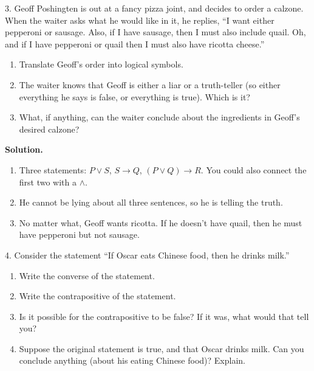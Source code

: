 \documentclass[10pt,]{book}
\theoremstyle{plain}
\theoremstyle{definition}
\theoremstyle{definition}
\theoremstyle{definition}
\numberwithin{equation}{section}
\def\imp{\rightarrow}
\begin{document}
\begin{exerciselist}
\begin{enumerate}[label=(\alph*)]
\end{enumerate}
\item[3.]\hypertarget{exercise-3}{}
    Geoff Poshingten is out at a fancy pizza joint, and decides to order a calzone. When the waiter asks what he would like in it, he replies, ``I want either pepperoni or sausage. Also, if I have sausage, then I must also include quail. Oh, and if I have pepperoni or quail then I must also have ricotta cheese.''
\leavevmode%
\begin{enumerate}[label=(\alph*)]
\item\hypertarget{li-87}{} Translate Geoff's order into logical symbols. %
\item\hypertarget{li-88}{} The waiter knows that Geoff is either a liar or a truth-teller (so either everything he says is false, or everything is true).  Which is it? %
\item\hypertarget{li-89}{} What, if anything, can the waiter conclude about the ingredients in Geoff's desired calzone? %
\end{enumerate}
\par\smallskip
\par\smallskip
\noindent\textbf{Solution.}\hypertarget{solution-9}{}\quad
\leavevmode%
\begin{enumerate}[label=(\alph*)]
\item\hypertarget{li-90}{} Three statements: \(P \vee S\), \(S \imp Q\), \((P \vee Q) \imp R\).  You could also connect the first two with a \(\wedge\). %
\item\hypertarget{li-91}{} He cannot be lying about all three sentences, so he is telling the truth. %
\item\hypertarget{li-92}{} No matter what, Geoff wants ricotta.  If he doesn't have quail, then he must have pepperoni but not sausage. %
\end{enumerate}
\item[4.]\hypertarget{exercise-4}{} Consider the statement ``If Oscar eats Chinese food, then he drinks milk.'' %
\leavevmode%
\begin{enumerate}[label=(\alph*)]
\item\hypertarget{li-93}{} Write the converse of the statement. %
\item\hypertarget{li-94}{} Write the contrapositive of the statement. %
\item\hypertarget{li-95}{} Is it possible for the contrapositive to be false? If it was, what would that tell you? %
\item\hypertarget{li-96}{} Suppose the original statement is true, and that Oscar drinks milk. Can you conclude anything (about his eating Chinese food)? Explain. %

\end{enumerate}
\end{exerciselist}
\end{document}
